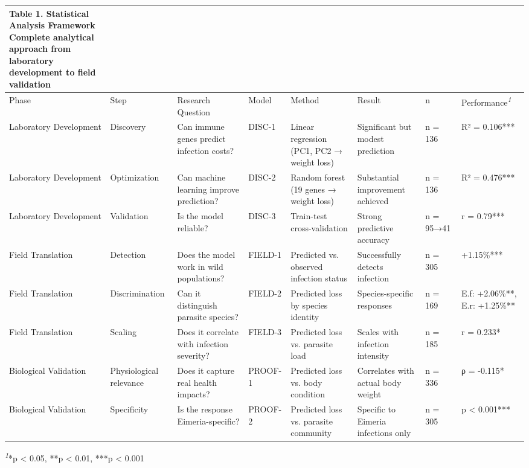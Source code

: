\setlength{\LTpost}{0mm}
\begin{longtable}{llllllll}
\caption*{
{\large Table 1. Statistical Analysis Framework} \\ 
{\small Complete analytical approach from laboratory development to field validation}
} \\ 
\toprule
Phase & Step & Research Question & Model & Method & Result & n & Performance\textsuperscript{\textit{1}} \\ 
\midrule\addlinespace[2.5pt]
Laboratory Development & Discovery & Can immune genes predict infection costs? & DISC-1 & Linear regression (PC1, PC2 → weight loss) & Significant but modest prediction & n = 136 & R² = 0.106*** \\ 
Laboratory Development & Optimization & Can machine learning improve prediction? & DISC-2 & Random forest (19 genes → weight loss) & Substantial improvement achieved & n = 136 & R² = 0.476*** \\ 
Laboratory Development & Validation & Is the model reliable? & DISC-3 & Train-test cross-validation & Strong predictive accuracy & n = 95→41 & r = 0.79*** \\ 
Field Translation & Detection & Does the model work in wild populations? & FIELD-1 & Predicted vs. observed infection status & Successfully detects infection & n = 305 & +1.15\%*** \\ 
Field Translation & Discrimination & Can it distinguish parasite species? & FIELD-2 & Predicted loss by species identity & Species-specific responses & n = 169 & E.f: +2.06\%**, E.r: +1.25\%** \\ 
Field Translation & Scaling & Does it correlate with infection severity? & FIELD-3 & Predicted loss vs. parasite load & Scales with infection intensity & n = 185 & r = 0.233* \\ 
Biological Validation & Physiological relevance & Does it capture real health impacts? & PROOF-1 & Predicted loss vs. body condition & Correlates with actual body weight & n = 336 & ρ = -0.115* \\ 
Biological Validation & Specificity & Is the response Eimeria-specific? & PROOF-2 & Predicted loss vs. parasite community & Specific to Eimeria infections only & n = 305 & p < 0.001*** \\ 
\bottomrule
\end{longtable}
\begin{minipage}{\linewidth}
\textsuperscript{\textit{1}}*p < 0.05, **p < 0.01, ***p < 0.001\\
\end{minipage}

